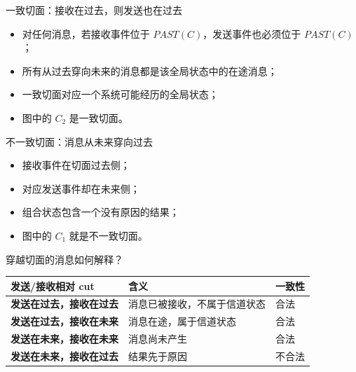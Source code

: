 \documentclass[UTF8,fontset=none,aspectratio=169,10pt]{beamer}
\begin{document}
\begin{frame}{一致切面：接收在过去，则发送也在过去}
\begin{itemize}
  \item 对任何消息，若接收事件位于 $PAST(C)$，发送事件也必须位于 $PAST(C)$；
  \item 所有从过去穿向未来的消息都是该全局状态中的在途消息；
  \item 一致切面对应一个系统可能经历的全局状态；
  \item 图中的 $C_2$ 是一致切面。
\end{itemize}
\vfill
\begin{center}
\end{center}
\end{frame}

\begin{frame}{不一致切面：消息从未来穿向过去}
\begin{center}
\end{center}
\vfill
\begin{itemize}
  \item 接收事件在切面过去侧；
  \item 对应发送事件却在未来侧；
  \item 组合状态包含一个没有原因的结果；
  \item 图中的 $C_1$ 就是不一致切面。
\end{itemize}
\end{frame}

\begin{frame}{穿越切面的消息如何解释？}
\scriptsize
\begin{tabularx}{\linewidth}{>{\bfseries}p{3.1cm}X X}
\toprule
发送/接收相对 cut & 含义 & 一致性 \\
\midrule
发送在过去，接收在过去 & 消息已被接收，不属于信道状态 & 合法 \\
发送在过去，接收在未来 & 消息在途，属于信道状态 & 合法 \\
发送在未来，接收在未来 & 消息尚未产生 & 合法 \\
发送在未来，接收在过去 & 结果先于原因 & 不合法 \\
\bottomrule
\end{tabularx}
\vfill
{}
\end{frame}
\end{document}
